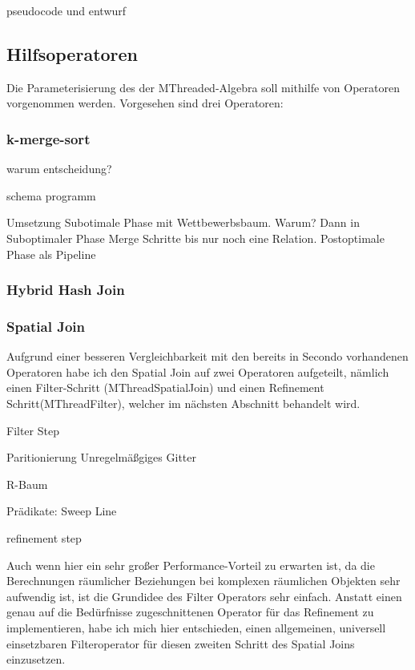 \documentclass[a4paper,12pt,twoside]{article}
\begin{document}
pseudocode und entwurf

\subsection{Hilfsoperatoren}

Die Parameterisierung des der MThreaded-Algebra soll mithilfe von Operatoren vorgenommen werden. Vorgesehen sind drei Operatoren:



\subsubsection{k-merge-sort}

warum entscheidung?

schema programm

Umsetzung Subotimale Phase mit Wettbewerbsbaum. Warum? Dann in Suboptimaler Phase Merge Schritte bis nur noch eine Relation. Postoptimale Phase als Pipeline

\subsubsection{Hybrid Hash Join}

\subsubsection{Spatial Join}
Aufgrund einer besseren Vergleichbarkeit mit den bereits in Secondo vorhandenen Operatoren habe ich den Spatial Join auf zwei Operatoren aufgeteilt, nämlich einen Filter-Schritt (MThreadSpatialJoin) und einen Refinement Schritt(MThreadFilter), welcher im nächsten Abschnitt behandelt wird.

Filter Step

Paritionierung Unregelmäßgiges Gitter

R-Baum

Prädikate: Sweep Line

refinement step

Auch wenn hier ein sehr großer Performance-Vorteil zu erwarten ist, da die Berechnungen räumlicher Beziehungen bei komplexen räumlichen Objekten sehr aufwendig ist, ist die Grundidee des Filter Operators sehr einfach. Anstatt einen genau auf die Bedürfnisse zugeschnittenen Operator für das Refinement zu implementieren, habe ich mich hier entschieden, einen allgemeinen, universell einsetzbaren Filteroperator für diesen zweiten Schritt des Spatial Joins einzusetzen. 
\end{document}
